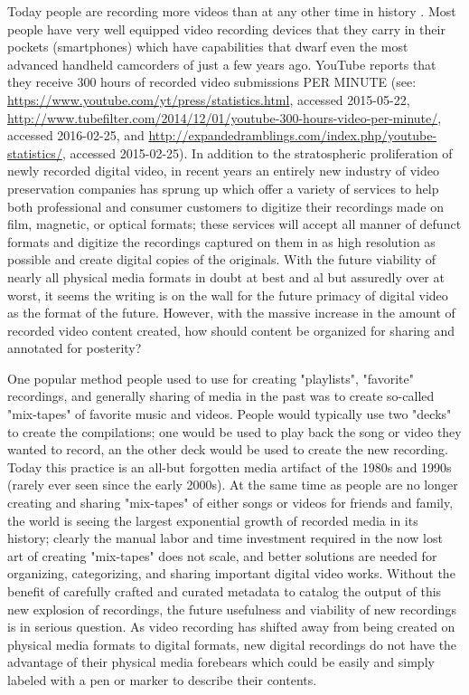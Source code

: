 Today people are recording more videos than at any other time in history \autocite[1]{WEB:Miede:2011}. Most people have very well equipped video recording devices that they carry in their pockets (smartphones) which have capabilities that dwarf even the most advanced handheld camcorders of just a few years ago.  YouTube reports that they receive 300 hours of recorded video submissions PER MINUTE (see: \url{https://www.youtube.com/yt/press/statistics.html}, accessed 2015-05-22, \url{http://www.tubefilter.com/2014/12/01/youtube-300-hours-video-per-minute/}, accessed 2016-02-25, and \url{http://expandedramblings.com/index.php/youtube-statistics/}, accessed 2015-02-25).  In addition to the stratospheric proliferation of newly recorded digital video, in recent years an entirely new industry of video preservation companies has sprung up which offer a variety of services to help both professional and consumer customers to digitize their recordings made on film, magnetic, or optical formats; these services will accept all manner of defunct formats and digitize the recordings captured on them in as high resolution as possible and create digital copies of the originals.  With the future viability of nearly all physical media formats in doubt at best and al but assuredly over at worst, it seems the writing is on the wall for the future primacy of digital video as the format of the future.  However, with the massive increase in the amount of recorded video content created, how should content be organized for sharing and annotated for posterity?

One popular method people used to use for creating "playlists", "favorite" recordings, and generally sharing of media in the past was to create so-called "mix-tapes" of favorite music and videos.  People would typically use two "decks" to create the compilations; one would be used to play back the song or video they wanted to record, an the other deck would be used to create the new recording.  Today this practice is an all-but forgotten media artifact of the 1980s and 1990s (rarely ever seen since the early 2000s).  At the same time as people are no longer creating and sharing "mix-tapes" of either songs or videos for friends and family, the world is seeing the largest exponential growth of recorded media in its history; clearly the manual labor and time investment required in the now lost art of creating "mix-tapes" does not scale, and better solutions are needed for organizing, categorizing, and sharing important digital video works.  Without the benefit of carefully crafted and curated metadata to catalog the output of this new explosion of recordings, the future usefulness and viability of new recordings is in serious question.  As video recording has shifted away from being created on physical media formats to digital formats, new digital recordings do not have the advantage of their physical media forebears which could be easily and simply labeled with a pen or marker to describe their contents.

